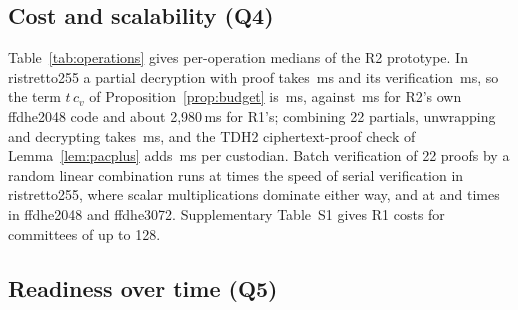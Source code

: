 \documentclass[Crown,sagev]{sagej}
\theoremstyle{plain}
\theoremstyle{definition}
\theoremstyle{remark}
\begin{document}
\subsection{Cost and scalability (Q4)}\label{sec:eval-cost}

Table~\ref{tab:operations} gives per-operation medians of the R2 prototype. In ristretto255 a partial decryption with proof takes \RtwoProveRis\,ms and its verification \RtwoVerifyRis\,ms, so the term $t\,c_v$ of Proposition~\ref{prop:budget} is \RtwoTcvRis\,ms, against \RtwoTcvTwoK\,ms for R2's own ffdhe2048 code and about 2{,}980\,ms for R1's; combining 22 partials, unwrapping and decrypting takes \RtwoCombineRis\,ms, and the TDH2 ciphertext-proof check of Lemma~\ref{lem:pacplus} adds \RtwoCtCheckRis\,ms per custodian. Batch verification of 22 proofs by a random linear combination runs at \RtwoBatchRis{} times the speed of serial verification in ristretto255, where scalar multiplications dominate either way, and at \RtwoBatchTwoK{} and \RtwoBatchThreeK{} times in ffdhe2048 and ffdhe3072. Supplementary Table~S1 gives R1 costs for committees of up to 128.

\begin{table}[t]
\caption{Median wall time per operation in the R2 prototype, 1{,}000 timed runs, CPython 3.13 on an Apple M4 Pro; ristretto255 through libsodium, RFC~7919 groups\cite{rfc7919} in pure Python. Batch verification uses 128-bit random coefficients.}
\label{tab:operations}
\centering
\small

\end{table}

\subsection{Readiness over time (Q5)}\label{sec:eval-temporal}
\end{document}
